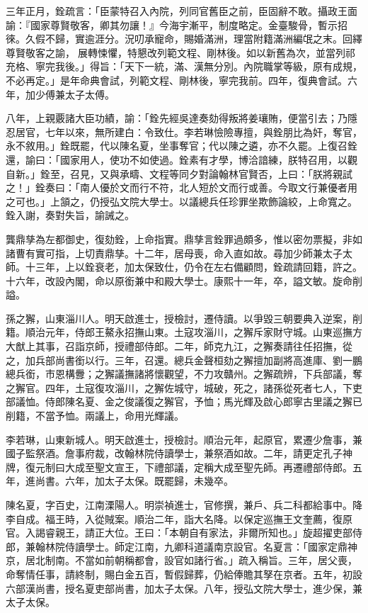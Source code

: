 \begin{pinyinscope}
三年正月，銓疏言：「臣蒙特召入內院，列同官舊臣之前，臣固辭不敢。攝政王面諭：『國家尊賢敬客，卿其勿讓！』今海宇漸平，制度略定。金臺駿骨，暫示招徠。久假不歸，實逾涯分。況叨承寵命，賜婚滿洲，理當附籍滿洲編氓之末。回繹尊賢敬客之諭，展轉悚懼，特懇改列範文程、剛林後。如以新舊為次，並當列祁充格、寧完我後。」得旨：「天下一統，滿、漢無分別。內院職掌等級，原有成規，不必再定。」是年命典會試，列範文程、剛林後，寧完我前。四年，復典會試。六年，加少傅兼太子太傅。

八年，上親覈諸大臣功績，諭：「銓先經吳達奏劾得叛將姜瓖賄，便當引去；乃隱忍居官，七年以來，無所建白：令致仕。李若琳憸險專擅，與銓朋比為奸，奪官，永不敘用。」銓既罷，代以陳名夏，坐事奪官；代以陳之遴，亦不久罷。上復召銓還，諭曰：「國家用人，使功不如使過。銓素有才學，博洽諳練，朕特召用，以觀自新。」銓至，召見，又與承疇、文程等同夕對論翰林官賢否，上曰：「朕將親試之！」銓奏曰：「南人優於文而行不符，北人短於文而行或善。今取文行兼優者用之可也。」上頷之，仍授弘文院大學士。以議總兵任珍罪坐欺飾論絞，上命寬之。銓入謝，奏對失旨，諭誡之。

龔鼎孳為左都御史，復劾銓，上命指實。鼎孳言銓罪過頗多，惟以密勿票擬，非如諸曹有實可指，上切責鼎孳。十二年，居母喪，命入直如故。尋加少師兼太子太師。十三年，上以銓衰老，加太保致仕，仍令在左右備顧問，銓疏請回籍，許之。十六年，改設內閣，命以原銜兼中和殿大學士。康熙十一年，卒，謚文敏。旋命削謚。

孫之獬，山東淄川人。明天啟進士，授檢討，遷侍讀。以爭毀三朝要典入逆案，削籍。順治元年，侍郎王鰲永招撫山東。土寇攻淄川，之獬斥家財守城。山東巡撫方大猷上其事，召詣京師，授禮部侍郎。二年，師克九江，之獬奏請往任招撫，從之，加兵部尚書銜以行。三年，召還。總兵金聲桓劾之獬擅加副將高進庫、劉一鵬總兵銜，市恩構釁；之獬議撫諸將懷觀望，不力攻贛州。之獬疏辨，下兵部議，奪之獬官。四年，土寇復攻淄川，之獬佐城守，城破，死之，諸孫從死者七人，下吏部議恤。侍郎陳名夏、金之俊議復之獬官，予恤；馬光輝及啟心郎寧古里議之獬已削籍，不當予恤。兩議上，命用光輝議。

李若琳，山東新城人。明天啟進士，授檢討。順治元年，起原官，累遷少詹事，兼國子監祭酒。詹事府裁，改翰林院侍讀學士，兼祭酒如故。二年，請更定孔子神牌，復元制曰大成至聖文宣王，下禮部議，定稱大成至聖先師。再遷禮部侍郎。五年，進尚書。六年，加太子太保。既罷歸，未幾卒。

陳名夏，字百史，江南溧陽人。明崇禎進士，官修撰，兼戶、兵二科都給事中。降李自成。福王時，入從賊案。順治二年，詣大名降。以保定巡撫王文奎薦，復原官。入謁睿親王，請正大位。王曰：「本朝自有家法，非爾所知也。」旋超擢吏部侍郎，兼翰林院侍讀學士。師定江南，九卿科道議南京設官。名夏言：「國家定鼎神京，居北制南。不當如前朝稱都會，設官如諸行省。」疏入稱旨。三年，居父喪，命奪情任事，請終制，賜白金五百，暫假歸葬，仍給俸贍其孥在京者。五年，初設六部漢尚書，授名夏吏部尚書，加太子太保。八年，授弘文院大學士，進少保，兼太子太保。


\end{pinyinscope}
